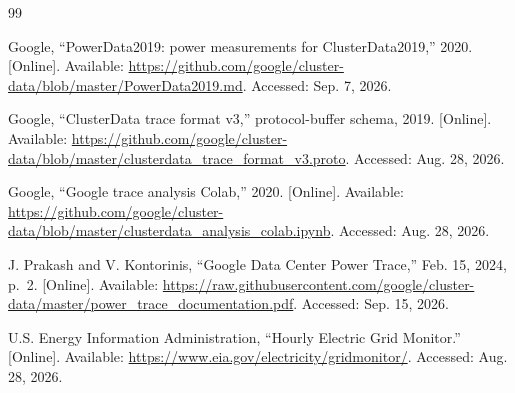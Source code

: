 \documentclass{UNCC-thesis}
\begin{document}
\begin{thebibliography}{99}


Google, ``PowerData2019: power measurements for ClusterData2019,'' 2020.
[Online]. Available:
\url{https://github.com/google/cluster-data/blob/master/PowerData2019.md}.
Accessed: Sep. 7, 2026.

Google, ``ClusterData trace format v3,'' protocol-buffer schema, 2019.
[Online]. Available:
\url{https://github.com/google/cluster-data/blob/master/clusterdata_trace_format_v3.proto}.
Accessed: Aug. 28, 2026.

Google, ``Google trace analysis Colab,'' 2020. [Online]. Available:
\url{https://github.com/google/cluster-data/blob/master/clusterdata_analysis_colab.ipynb}.
Accessed: Aug. 28, 2026.

J. Prakash and V. Kontorinis, ``Google Data Center Power Trace,''
Feb. 15, 2024, p.~2. [Online]. Available:
\url{https://raw.githubusercontent.com/google/cluster-data/master/power_trace_documentation.pdf}.
Accessed: Sep. 15, 2026.

U.S. Energy Information Administration, ``Hourly Electric Grid Monitor.''
[Online]. Available: \url{https://www.eia.gov/electricity/gridmonitor/}.
Accessed: Aug. 28, 2026.



\end{thebibliography}

\clearpage
{}
\renewcommand{\chaptertitlename}{APPENDIX}
\appendix
\end{document}
